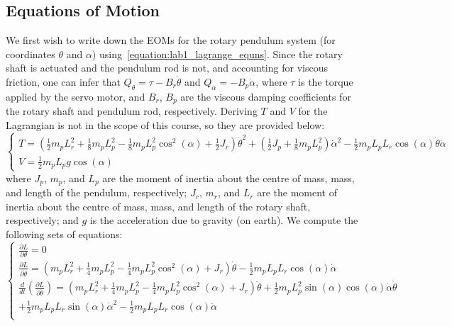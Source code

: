 \subsection{Equations of Motion}
We first wish to write down the EOMs for the rotary pendulum system (for coordinates \( \theta \) and \( \alpha \)) using~\eqref{equation:lab1_lagrange_equns}. Since the rotary shaft is actuated and the pendulum rod is not, and accounting for viscous friction, one can infer that $Q_\theta = \tau - B_r \dot{\theta} $ and $Q_\alpha = -B_p \dot{\alpha}$, where $\tau$ is the torque applied by the servo motor, and $B_r$, $B_p$ are the viscous damping coefficients for the rotary shaft and pendulum rod, respectively. Deriving $T$ and $V$ for the Lagrangian is not in the scope of this course, so they are provided below:
\begin{equation*}
    \begin{cases}
        T = \left(\frac{1}{2} m_p L_{r}^2 + \frac{1}{8} m_p L_{p}^2 - \frac{1}{8} m_p L_{p}^2 \cos^2(\alpha) + \frac{1}{2} J_r\right) \dot{\theta}^2 + \left(\frac{1}{2} J_p + \frac{1}{8} m_p L_{p}^2 \right) \dot{\alpha}^2 - \frac{1}{2} m_p L_p L_r \cos(\alpha) \dot{\theta} \dot{\alpha} \\
        V = \frac{1}{2} m_p L_p g \cos(\alpha)
    \end{cases}
\end{equation*}
where $J_p$, $m_p$, and $L_p$ are the moment of inertia about the centre of mass, mass, and length of the pendulum, respectively; $J_r$, $m_r$, and $L_r$ are the moment of inertia about the centre of mass, mass, and length of the rotary shaft, respectively; and $g$ is the acceleration due to gravity (on earth).
We compute the following sets of equations:
\[
    \begin{cases}
        \frac{\partial{L}}{\partial \theta}=0                                                                                                                                                      \\
        \frac{\partial L}{\partial \dot{\theta}}=\left( m_pL_r^2 +\frac{1}{4} m_p L_p^2-\frac{1}{4}m_pL_p^2\cos^2(\alpha)+J_r\right)\dot{\theta} - \frac{1}{2} m_pL_pL_r\cos{(\alpha)}\dot{\alpha} \\
        \frac{d}{dt} \left(\frac{\partial L}{\partial \dot{\theta}}\right)= \left(m_pL_r^2 +\frac{1}{4}m_pL_p^2-\frac{1}
        {4}m_pL_p^2\cos^2(\alpha)+J_r\right)\ddot{\theta} + \frac{1}{2}m_pL_p^2\sin{(\alpha)}\cos{(\alpha)} \dot{\alpha}\dot{\theta}                                                               \\+ \frac{1}{2}m_pL_pL_r\sin{(\alpha)}\dot{\alpha}^2-\frac{1}{2}m_pL_pL_r\cos{(\alpha)}\ddot{\alpha} \\
    \end{cases}
\]
